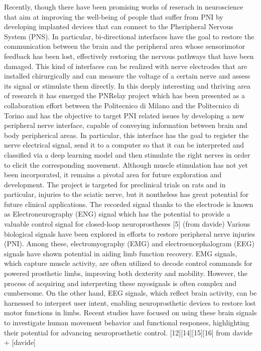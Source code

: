 \documentclass{Configuration_Files/PoliMi3i_thesis}
\begin{document}
Recently, though there have been promising works of reserach in neuroscience that aim at improving the well-being of people that suffer from PNI by developing implanted devices that can connect to the Pheripheral Nervous System (PNS).
In particular, bi-directional interfaces have the goal to restore the communication between the brain and the peripheral area whose sensorimotor feedback has been lost, effectively restoring the nervous pathways that have been damaged.
This kind of interfaces can be realized with nerve electrodes that are installed chirurgically and can measure the voltage of a certain nerve and assess its signal or stimulate them directly.
In this deeply interesting and thriving area of research it has emerged the PNRelay project 
which has been presented as a collaboration effort between the Politecnico di Milano and the Politecnico di Torino and has the objective to target PNI related issues by developing a new peripheral nerve interface, capable of conveying information between brain and body peripherical areas.
In particular, this interface has the goal to register the nerve electrical signal, send it to a computer so that it can be interpreted and classified via a deep learning model and then stimulate the right nerves in order to elicit the corresponding movement.
Although muscle stimulation has not yet been incorporated, it remains a pivotal area for future exploration and development.
The project is targeted for preclinical trials on rats and in particular, injuries to the sciatic nerve, but it nontheless has great potential for future clinical applications.
The recorded signal thanks to the electrode is known as  Electroneurography (ENG) signal
which has the potential to provide a valuable control signal for closed-loop neuroprostheses [5] (from davide)
Various biological signals have been explored in efforts to restore peripheral nerve injuries (PNI). Among these, electromyography (EMG) and electroencephalogram (EEG) signals have shown potential in aiding limb function recovery. EMG signals, which capture muscle activity, are often utilized to decode control commands for powered prosthetic limbs, improving both dexterity and mobility. However, the process of acquiring and interpreting these myosignals is often complex and cumbersome. On the other hand, EEG signals, which reflect brain activity, can be harnessed to interpret user intent, enabling neuroprosthetic devices to restore lost motor functions in limbs. Recent studies have focused on using these brain signals to investigate human movement behavior and functional responses, highlighting their potential for advancing neuroprosthetic control. [12][14][15][16] from davide + [davide]
\end{document}

